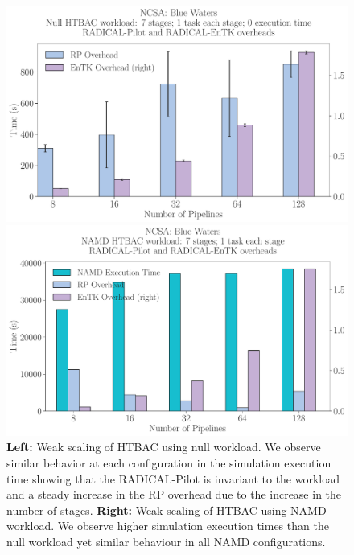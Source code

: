 \begin{figure}[!htbp]
  \centering
  \begin{minipage}[b]{0.49\textwidth}
  \centering
  \includegraphics[width=\textwidth]{FIGURES/null_workload_overheads.pdf}
  \end{minipage}
  \begin{minipage}[b]{0.49\textwidth}
  \centering
  \includegraphics[width=\textwidth]{FIGURES/namd_workload_overheads.pdf}
  \end{minipage}

\caption{\textbf{Left:} Weak scaling of HTBAC using null workload. We observe
similar behavior at each configuration in the simulation execution time
showing that the RADICAL-Pilot is invariant to the workload and a steady
increase in the RP overhead due to the increase in the number of stages.
\textbf{Right:} Weak scaling of HTBAC using NAMD workload. We observe higher
simulation execution times than the null workload yet similar behaviour in
all NAMD configurations.}\label{fig:htbac_perf}
\end{figure}


